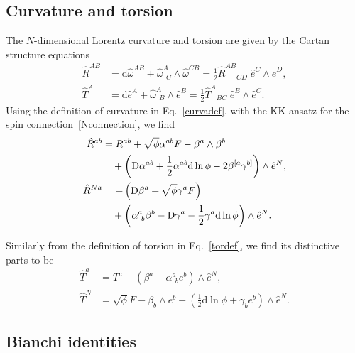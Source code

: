 \documentclass[aps,prd,12pt,superscriptaddress,showpacs,showkeys,longbibliography,reprint,nofootinbib]{revtex4-1}
\begin{document}
\subsection{Curvature and torsion}

The $N$-dimensional Lorentz curvature and torsion are given by the Cartan structure equations
\begin{align}
  \label{curvadef}
  \hat{R}^{AB} &= \mbox{d}\hat{\omega}^{AB}+\hat{\omega}^A_{\ \ C}\wedge\hat{\omega}^{CB} = \frac{1}{2} \hat{R}^{AB}{}_{CD} \; \hat{e}^C \wedge \hat{e}^D,\\
  \label{tordef}
  \hat{T}^A &= \mbox{d}\hat{e}^A+\hat{\omega}^A_{\ \ B}\wedge\hat{e}^B = \frac{1}{2} \hat{T}^{A}{}_{BC} \; \hat{e}^B \wedge \hat{e}^C. 
\end{align}
Using the definition of curvature in Eq.~\eqref{curvadef},  with the KK ansatz for the spin connection~\eqref{Nconnection}, we find
\begin{align}
  \label{R1}
  \hat{R}^{ab}&=R^{ab}+\sqrt{\phi}\alpha^{ab}F-\beta^a\wedge\beta^b\notag\\
  & \quad +\left(\mbox{D}\alpha^{ab}+\frac{1}{2}\alpha^{ab}\mbox{d}\ln\phi-2\beta^{[a}\gamma^{b]}\right)\wedge\hat{e}^N,\\
  \label{R2}
  \hat{R}^{Na}&=-\left(\mbox{D}\beta^a+\sqrt{\phi}\gamma^a F\right)\notag\\
  & \quad +\left(\alpha^a_{\ b}\beta^b-\mbox{D}\gamma^a-\frac{1}{2}\gamma^a\mbox{d}\ln\phi\right)\wedge\hat{e}^N.
\end{align}

Similarly from the definition of torsion in Eq.~\eqref{tordef}, we find its distinctive parts to be
\begin{align}\label{T1}
  \hat{T}^a &= T^a+\left(\beta^a-\alpha^a_{\ \ b}e^b\right)\wedge\hat{e}^N,\\
  \label{T2}
  \hat{T}^N &= \sqrt{\phi}F-\beta_b\wedge e^b+\left(\frac{1}{2}\mbox{d}\ln\phi+\gamma_be^b\right)\wedge\hat{e}^N.
\end{align}

\subsection{Bianchi identities\label{sec:bianchi}}
\end{document}
